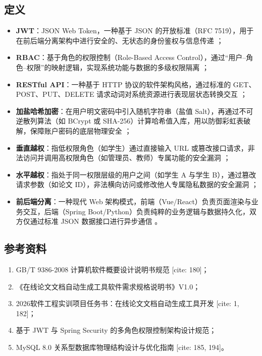 \documentclass{../template/softeng}
\begin{document}
\subsection{定义}
\begin{itemize}
    \item \textbf{JWT}：JSON Web Token，一种基于 JSON 的开放标准（RFC 7519），用于在前后端分离架构中进行安全的、无状态的身份鉴权与信息传递 ；
    \item \textbf{RBAC}：基于角色的权限控制（Role-Based Access Control），通过“用户--角色--权限”的映射逻辑，实现系统功能与数据的多级权限隔离 ；
    \item \textbf{RESTful API}：一种基于 HTTP 协议的软件架构风格，通过标准的 GET、POST、PUT、DELETE 请求动词对系统资源进行表现层状态转换交互 ；
    \item \textbf{加盐哈希加密}：在用户明文密码中引入随机字符串（盐值 Salt），再通过不可逆散列算法（如 BCrypt 或 SHA-256）计算哈希值入库，用以防御彩虹表破解，保障账户密码的底层物理安全 ；
    \item \textbf{垂直越权}：指低权限角色（如学生）通过直接输入 URL 或篡改接口请求，非法访问并调用高权限角色（如管理员、教师）专属功能的安全漏洞 ；
    \item \textbf{水平越权}：指处于同一权限层级的用户之间（如学生 A 与学生 B），通过篡改请求参数（如论文 ID），非法横向访问或修改他人专属隐私数据的安全漏洞 ；
    \item \textbf{前后端分离}：一种现代 Web 架构模式，前端（Vue/React）负责页面渲染与业务交互，后端（Spring Boot/Python）负责纯粹的业务逻辑与数据持久化，双方仅通过标准 JSON 数据接口进行异步通信 。
\end{itemize}

\subsection{参考资料}
\begin{enumerate}
    \item GB/T 9386-2008 计算机软件概要设计说明书规范 [cite: 180]；
    \item 《在线论文文档自动生成工具软件需求规格说明书》V1.0；
    \item 2026软件工程实训项目任务书：在线论文文档自动生成工具开发 [cite: 1, 182]；
    \item 基于 JWT 与 Spring Security 的多角色权限控制架构设计规范；
    \item MySQL 8.0 关系型数据库物理结构设计与优化指南 [cite: 185, 194]。
\end{enumerate}
\end{document}
